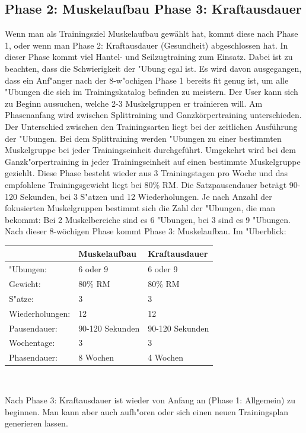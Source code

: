 \documentclass[FIPLY_base.tex]{subfiles}
\begin{document}
	\subsection{Phase 2: Muskelaufbau \newline Phase 3: Kraftausdauer}	
	Wenn man als Trainingsziel \grqq{}Muskelaufbau\grqq{} gewählt hat, kommt diese nach Phase 1, oder wenn man Phase 2: Kraftausdauer (Gesundheit) abgeschlossen hat. In dieser Phase kommt viel Hantel- und Seilzugtraining zum Einsatz. Dabei ist zu beachten, dass die Schwierigkeit der "Ubung egal ist. Es wird davon ausgegangen, dass ein Anf"anger nach der 8-w"ochigen Phase 1 bereits fit genug ist, um alle "Ubungen die sich im Trainingskatalog befinden zu meistern. 
	\newline
	Der User kann sich zu Beginn aussuchen, welche 2-3 Muskelgruppen er trainieren will. Am Phasenanfang wird zwischen Splittraining und Ganzkörpertraining unterschieden. Der Unterschied zwischen den Trainingsarten liegt bei der zeitlichen Ausführung der "Ubungen. Bei dem Splittraining werden "Ubungen zu einer bestimmten Muskelgruppe bei jeder Trainingseinheit durchgeführt. Umgekehrt wird bei dem Ganzk"orpertraining in jeder Trainingseinheit auf einen bestimmte Muskelgruppe geziehlt. 
	\newline
	Diese Phase besteht wieder aus 3 Trainingstagen pro Woche und das empfohlene Trainingsgewicht liegt bei 80\% RM. Die Satzpausendauer beträgt 90-120 Sekunden, bei 3 S"atzen und 12 Wiederholungen. Je nach Anzahl der fokusierten Muskelgruppen bestimmt sich die Zahl der "Ubungen, die man bekommt: Bei 2 Muskelbereiche sind es 6 "Ubungen, bei 3 sind es 9 "Ubungen. Nach dieser 8-wöchigen Phase kommt Phase 3: Muskelaufbau.
	\newline
	Im "Uberblick:
	\newline
	\begin{center}
		\def\arraystretch{1.3}%
		\begin{tabular}{| l || l | l |}
			\hline
			& Muskelaufbau & Kraftausdauer \\ \hline
			"Ubungen: & 6 oder 9 & 6 oder 9 \\ \hline 
			Gewicht: & 80\% RM & 80\% RM \\ \hline
			S"atze: & 3 & 3\\ \hline
			Wiederholungen: & 12 & 12\\ \hline
			Pausendauer: & 90-120 Sekunden & 90-120 Sekunden \\ \hline
			Wochentage: & 3 & 3\\ \hline
			Phasendauer: & 8 Wochen & 4 Wochen \\ \hline
		\end{tabular} \\
	\end{center}
	Nach Phase 3: Kraftausdauer ist wieder von Anfang an (Phase 1: Allgemein) zu beginnen. Man kann aber auch aufh"oren oder sich einen neuen Trainingsplan generieren lassen.
	
\end{document}
